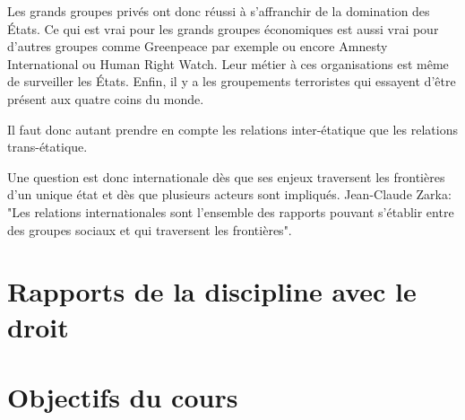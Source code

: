 ﻿\documentclass[12pt, a4paper, openany]{book}
\begin{document}
Les grands groupes privés ont donc réussi à s'affranchir de la domination des États. Ce qui est vrai pour les grands groupes économiques est aussi vrai pour d'autres groupes comme Greenpeace par exemple ou encore Amnesty International ou Human Right Watch. Leur métier à ces organisations est même de surveiller les États. Enfin, il y a les groupements terroristes qui essayent d'être présent aux quatre coins du monde.

Il faut donc autant prendre en compte les relations inter-étatique que les relations trans-étatique.
		

Une question est donc internationale dès que ses enjeux traversent les frontières d'un unique état et dès que plusieurs acteurs sont impliqués. Jean-Claude Zarka: "Les relations internationales sont l'ensemble des rapports pouvant s'établir entre des groupes sociaux et qui traversent les frontières".
		
	\section{Rapports de la discipline avec le droit}

	\section{Objectifs du cours}
\end{document}
